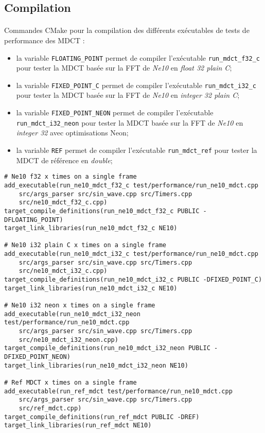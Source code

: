 \documentclass{article}
\begin{document}
\subsection{Compilation}\label{app:perf_mdct_ne10_cmake}
\paragraph{}
Commandes CMake pour la compilation des différents exécutables de tests de performance des MDCT :
\begin{itemize}
    \item la variable \texttt{FLOATING\_POINT} permet de compiler l'exécutable \texttt{run\_mdct\_f32\_c} pour tester la MDCT basée sur la FFT de \emph{Ne10} en \emph{float 32 plain C};
    \item la variable \texttt{FIXED\_POINT\_C} permet de compiler l'exécutable \texttt{run\_mdct\_i32\_c} pour tester la MDCT basée sur la FFT de \emph{Ne10} en \emph{integer 32 plain C};
    \item la variable \texttt{FIXED\_POINT\_NEON} permet de compiler l'exécutable \texttt{run\_mdct\_i32\_neon} pour tester la MDCT basée sur la FFT de \emph{Ne10} en \emph{integer 32} avec optimisations Neon;
    \item la variable \texttt{REF} permet de compiler l'exécutable \texttt{run\_mdct\_ref} pour tester la MDCT de référence en \emph{double};
\end{itemize}
\lstset{language=make}
\begin{lstlisting}
# Ne10 f32 x times on a single frame
add_executable(run_ne10_mdct_f32_c test/performance/run_ne10_mdct.cpp
    src/args_parser src/sin_wave.cpp src/Timers.cpp
    src/ne10_mdct_f32_c.cpp)
target_compile_definitions(run_ne10_mdct_f32_c PUBLIC -DFLOATING_POINT)
target_link_libraries(run_ne10_mdct_f32_c NE10)

# Ne10 i32 plain C x times on a single frame
add_executable(run_ne10_mdct_i32_c test/performance/run_ne10_mdct.cpp
    src/args_parser src/sin_wave.cpp src/Timers.cpp
    src/ne10_mdct_i32_c.cpp)
target_compile_definitions(run_ne10_mdct_i32_c PUBLIC -DFIXED_POINT_C)
target_link_libraries(run_ne10_mdct_i32_c NE10)

# Ne10 i32 neon x times on a single frame
add_executable(run_ne10_mdct_i32_neon test/performance/run_ne10_mdct.cpp
    src/args_parser src/sin_wave.cpp src/Timers.cpp
    src/ne10_mdct_i32_neon.cpp)
target_compile_definitions(run_ne10_mdct_i32_neon PUBLIC -DFIXED_POINT_NEON)
target_link_libraries(run_ne10_mdct_i32_neon NE10)

# Ref MDCT x times on a single frame
add_executable(run_ref_mdct test/performance/run_ne10_mdct.cpp
    src/args_parser src/sin_wave.cpp src/Timers.cpp
    src/ref_mdct.cpp)
target_compile_definitions(run_ref_mdct PUBLIC -DREF)
target_link_libraries(run_ref_mdct NE10)
\end{lstlisting}
\end{document}
